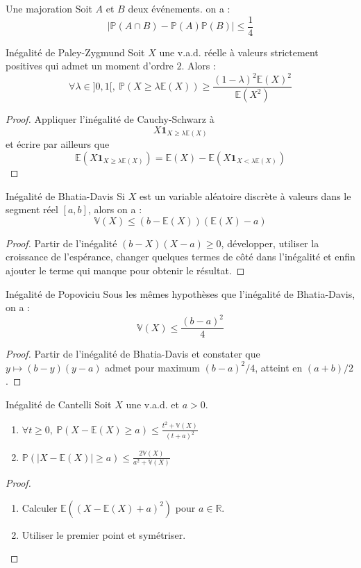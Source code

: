 \documentclass[french]{article}
\renewcommand{\P}{\mathbb{P}}
\newcommand{\R}{\mathbb{R}}
\newcommand{\E}{\mathbb{E}}
\newcommand{\V}{\mathbb{V}}
\theoremstyle{theorem}
\theoremstyle{definition}
\begin{document}
\begin{lem}{Une majoration}
	Soit $A$ et $B$ deux événements. on a : $$\lvert\P(A\cap B)-\P(A)\P(B)\rvert\leqslant\frac{1}{4}$$
\end{lem}

\begin{lem}{Inégalité de Paley-Zygmund}
	Soit $X$ une v.a.d. réelle à valeurs strictement positives qui admet un moment d'ordre $2$. Alors : $$\forall \lambda\in]0,1[,\ \P(X\geqslant\lambda\E(X))\geqslant\frac{(1-\lambda)^2\E(X)^2}{\E(X^2)}$$
\end{lem}
\begin{proof}
	Appliquer l'inégalité de Cauchy-Schwarz à $$X\mathbf{1}_{X\geqslant\lambda\E(X)}$$ et écrire par ailleurs que $$\E(X\mathbf{1}_{X\geqslant\lambda\E(X)})=\E(X)-\E(X\mathbf{1}_{X<\lambda\E(X)})$$
\end{proof}

\begin{lem}{Inégalité de Bhatia-Davis}
	Si $X$ est un variable aléatoire discrète à valeurs dans le segment réel $[a,b]$, alors on a : $$\V(X)\leqslant (b-\E(X))(\E(X)-a)$$
\end{lem}
\begin{proof}
	Partir de l'inégalité $(b-X)(X-a)\geqslant0$, développer, utiliser la croissance de l'espérance, changer quelques termes de côté dans l'inégalité et enfin ajouter le terme qui manque pour obtenir le résultat.
\end{proof}

\begin{lem}{Inégalité de Popoviciu}
	Sous les mêmes hypothèses que l'inégalité de Bhatia-Davis, on a : $$\V(X)\leqslant\frac{(b-a)^2}{4}$$
\end{lem}
\begin{proof}
	Partir de l'inégalité de Bhatia-Davis et constater que $y\mapsto (b-y)(y-a)$ admet pour maximum $(b-a)^2/4$, atteint en $(a+b)/2$.
\end{proof}

\begin{lem}{Inégalité de Cantelli}
	Soit $X$ une v.a.d. et $a>0$.
	\begin{enumerate}
		\item $\forall t\geqslant0,\ \P(X-\E(X)\geqslant a)\leqslant\displaystyle\frac{t^2+\V(X)}{(t+a)^2}$
		\item $\P(\lvert X-\E(X)\rvert\geqslant a)\leqslant\displaystyle\frac{2\V(X)}{a^2+\V(X)}$
	\end{enumerate}
\end{lem}
\begin{proof}
	\begin{enumerate}
		\item Calculer $\E((X-\E(X)+a)^2)$ pour $a\in\R$.
		\item Utiliser le premier point et symétriser.
	\end{enumerate}
\end{proof}
\end{document}
